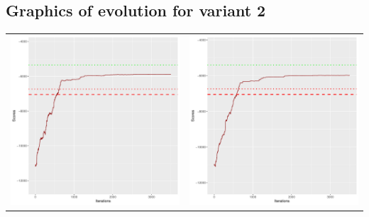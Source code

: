 \documentclass[]{scrartcl}
\begin{document}
\clearpage

\subsection{Graphics of evolution for variant 2}

\begin{table}[h!]
\begin{tabular}{cc}
\includegraphics[scale = 0.4]{./figs/alarm/v2/30/boundsEvolution-3502.pdf} & 
\includegraphics[scale = 0.4]{./figs/alarm/v2/50/boundsEvolution-3502.pdf} \\

\end{tabular}
\end{table}
\end{document}
